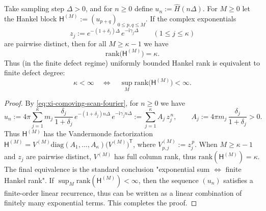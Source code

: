 \begin{theorem}\label{thm:xi-comoving-scan-hankel-rank-defect}
Take sampling step \(\Delta>0\), and for \(n\ge 0\) define
\(
u_n:=\widehat H(n\Delta)
\).
For \(M\ge 0\) let the Hankel block
\(
\mathsf H^{(M)}:=(u_{p+q})_{0\le p,q\le M}
\).
If the complex exponentials
\[
z_j:=e^{-(1+\delta_j)\Delta}\,e^{-\mathrm{i}\gamma_j\Delta}\qquad(1\le j\le \kappa)
\]
are pairwise distinct, then for all \(M\ge \kappa-1\) we have
\[
\boxed{\;\mathrm{rank}\bigl(\mathsf H^{(M)}\bigr)=\kappa.\;}
\]
Thus (in the finite defect regime) uniformly bounded Hankel rank is equivalent to finite defect degree:
\[
\kappa<\infty\quad\Longleftrightarrow\quad \sup_M\mathrm{rank}\bigl(\mathsf H^{(M)}\bigr)<\infty.
\]
\end{theorem}

\begin{proof}
By \eqref{eq:xi-comoving-scan-fourier}, for \(n\ge 0\) we have
\[
u_n
:=4\pi\sum_{j=1}^{\kappa}m_j\,\frac{\delta_j}{1+\delta_j}\,e^{-(1+\delta_j)n\Delta}\,e^{-\mathrm{i}\gamma_j n\Delta}
:=\sum_{j=1}^{\kappa}A_j\,z_j^{\,n},
\qquad
A_j:=4\pi m_j\,\frac{\delta_j}{1+\delta_j}>0.
\]
Thus \(\mathsf H^{(M)}\) has the Vandermonde factorization
\(
\mathsf H^{(M)}=V^{(M)}\mathrm{diag}(A_1,\dots,A_\kappa)\bigl(V^{(M)}\bigr)^{\mathsf T}
\),
where \(V^{(M)}_{p,j}:=z_j^{\,p}\).
When \(M\ge\kappa-1\) and \(z_j\) are pairwise distinct, \(V^{(M)}\) has full column rank, thus \(\mathrm{rank}(\mathsf H^{(M)})=\kappa\).
The final equivalence is the standard conclusion "exponential sum \(\Longleftrightarrow\) finite Hankel rank". If \(\sup_M\mathrm{rank}(\mathsf H^{(M)})<\infty\), then the sequence \((u_n)\) satisfies a finite-order linear recurrence, thus can be written as a linear combination of finitely many exponential terms. This completes the proof.
\end{proof}

